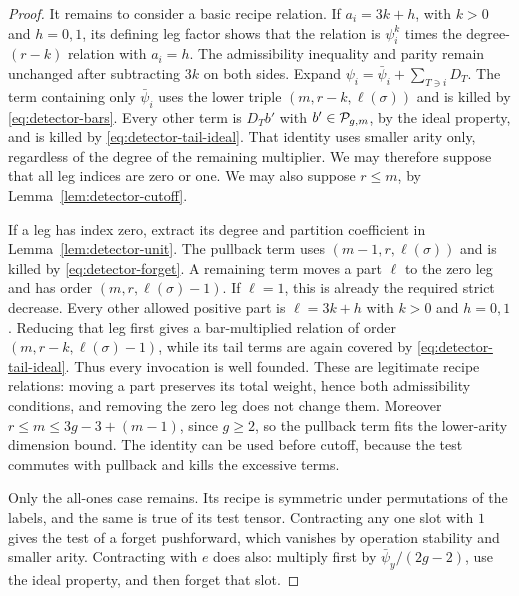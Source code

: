\begin{proof}
It remains to consider a basic recipe relation.  If
\(a_i=3k+h\), with \(k>0\) and \(h=0,1\), its defining
leg factor shows that the relation is \(\psi_i^k\) times
the degree-\((r-k)\) relation with \(a_i=h\).
The admissibility inequality and parity remain unchanged
after subtracting \(3k\) on both sides.  Expand
\(\psi_i=\bar\psi_i+\sum_{T\ni i}D_T\).
The term containing only \(\bar\psi_i\) uses the lower
triple \((m,r-k,\ell(\sigma))\) and is killed by
\eqref{eq:detector-bars}.  Every other term is \(D_Tb'\)
with \(b'\in\mathcal P_{g,m}\), by the ideal property, and is
killed by \eqref{eq:detector-tail-ideal}.  That identity
uses smaller arity only, regardless of the degree of
the remaining multiplier.  We may therefore suppose that all
leg indices are zero or one.  We may also suppose \(r\leq m\),
by Lemma~\ref{lem:detector-cutoff}.

If a leg has index zero, extract its degree and partition
coefficient in Lemma~\ref{lem:detector-unit}.  The pullback
term uses \((m-1,r,\ell(\sigma))\) and is killed by
\eqref{eq:detector-forget}.  A remaining term moves a part
\(\ell\) to the zero leg and has order
\((m,r,\ell(\sigma)-1)\).  If \(\ell=1\), this is already
the required strict decrease.  Every other allowed positive
part is \(\ell=3k+h\) with \(k>0\) and \(h=0,1\).
Reducing that leg first gives a bar-multiplied relation
of order \((m,r-k,\ell(\sigma)-1)\), while its tail terms
are again covered by \eqref{eq:detector-tail-ideal}.
Thus every invocation is well founded.  These are legitimate recipe
relations: moving a part preserves its total weight, hence
both admissibility conditions, and removing the zero leg
does not change them.  Moreover
\(r\leq m\leq3g-3+(m-1)\), since \(g\geq2\), so the
pullback term fits the lower-arity dimension bound.
The identity can be used before cutoff, because the test
commutes with pullback and kills the excessive terms.

Only the all-ones case remains.  Its recipe is symmetric
under permutations of the labels, and the same is true of
its test tensor.  Contracting any one slot with \(1\)
gives the test of a forget pushforward, which vanishes by
operation stability and smaller arity.  Contracting with
\(e\) does also: multiply first by
\(\bar\psi_y/(2g-2)\), use the ideal property, and then
forget that slot.


\end{proof}
